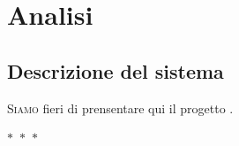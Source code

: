 \chapter{Analisi}
\section{Descrizione del sistema} 
\lettrine{S}{iamo} fieri di prensentare qui il progetto \textbf{\ProjectTitle}. \lipsum[2]

\begin{center}
	$\ast$~$\ast$~$\ast$
\end{center}

\lipsum

